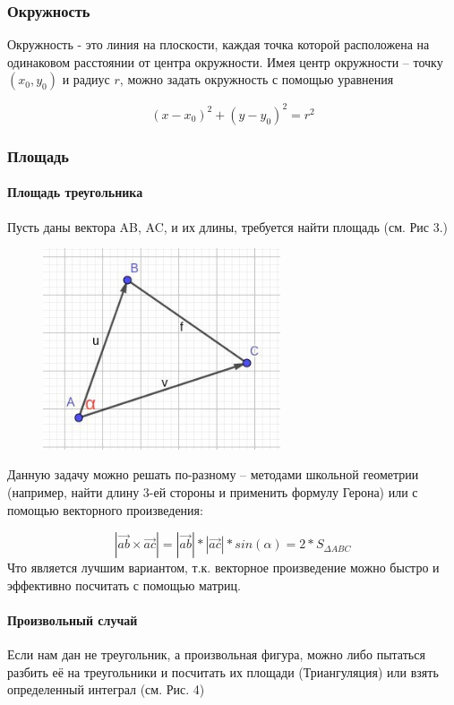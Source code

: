 \subsubsection{Окружность}
Окружность - это линия на плоскости, каждая точка которой расположена на одинаковом расстоянии от центра окружности. \newline \newline
Имея центр окружности -- точку $(x_0, y_0)$ и радиус $r$, можно задать окружность с помощью уравнения

\[
    (x - x_0)^2 + (y - y_0)^2 = r^2
\]

\subsubsection{Площадь}

\paragraph*{Площадь треугольника} Пусть даны вектора AB, AC, и их длины, требуется найти площадь (см. Рис 3.)

\begin{figure}[H]
    \centering
    \includegraphics[width = 7cm]{Triangle.jpeg}
    \caption{}
    \label{fig:float}
\end{figure}

Данную задачу можно решать по-разному -- методами школьной геометрии (например, найти длину 3-ей стороны и применить формулу Герона) или с помощью векторного произведения:

\[
    |\vec{ab} \times \vec{ac}| = |\vec{ab}| * |\vec{ac}| * sin(\alpha) = 2 * S_{\Delta ABC}
\]
Что является лучшим вариантом, т.к. векторное произведение можно быстро и эффективно посчитать с помощью матриц.

\paragraph*{Произвольный случай} Если нам дан не треугольник, а произвольная фигура, можно либо пытаться разбить её на треугольники и посчитать их площади (Триангуляция) или взять определенный интеграл (см. Рис. 4)

